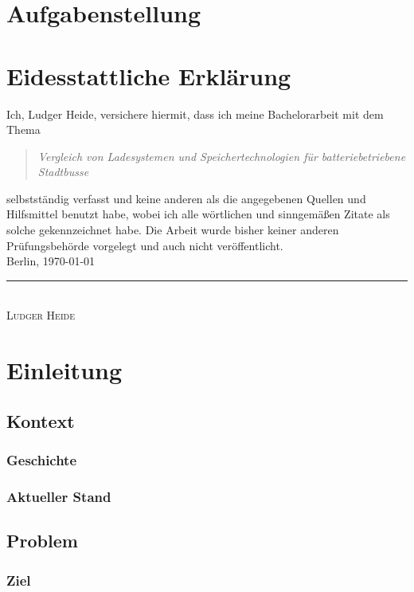 \documentclass[twoside]{scrreprt}
\begin{document}
\chapter*{Aufgabenstellung}

\chapter*{Eidesstattliche Erklärung}
Ich, Ludger Heide, versichere hiermit, dass ich meine Bachelorarbeit mit dem Thema
\begin{quote}
	\emph{Vergleich von Ladesystemen und Speichertechnologien für batteriebetriebene Stadtbusse}
\end{quote}
selbstständig verfasst und keine anderen als die angegebenen Quellen und Hilfsmittel benutzt habe, wobei ich alle wörtlichen und sinngemäßen Zitate als solche gekennzeichnet habe. Die Arbeit wurde bisher keiner anderen Prüfungsbehörde vorgelegt und auch nicht veröffentlicht.\\[6ex]
Berlin, \today\\
\newline
\rule{4cm}{0.5pt}\\
\textsc{Ludger Heide} 

\tableofcontents

\listoffigures

\listoftables
\newpage


\chapter{Einleitung}
\section{Kontext} %
\subsection{Geschichte}
\subsection{Aktueller Stand}
\section{Problem}
\subsection{Ziel} %
\end{document}

